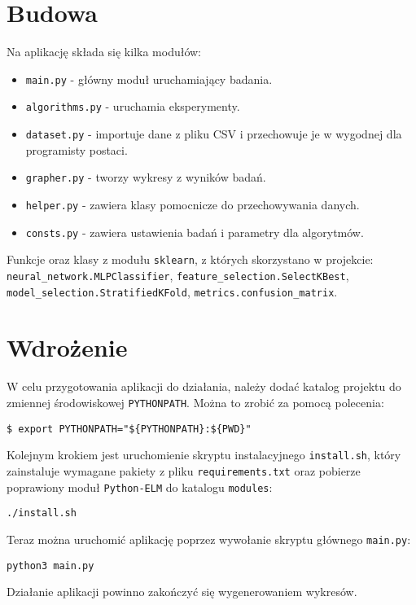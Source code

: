 \newpage

\section{Budowa}

Na aplikację składa się kilka modułów:

\begin{itemize}
    \item \texttt{main.py} - główny moduł uruchamiający badania.
    \item \texttt{algorithms.py} - uruchamia eksperymenty.
    \item \texttt{dataset.py} - importuje dane z pliku CSV i przechowuje je w wygodnej dla programisty postaci.
    \item \texttt{grapher.py} - tworzy wykresy z wyników badań.
    \item \texttt{helper.py} - zawiera klasy pomocnicze do przechowywania danych.
    \item \texttt{consts.py} - zawiera ustawienia badań i parametry dla algorytmów.
\end{itemize}

Funkcje oraz klasy z modułu \texttt{sklearn}, z których skorzystano w projekcie: \texttt{neural\_network.MLPClassifier}, \texttt{feature\_selection.SelectKBest}, \texttt{model\_selection.StratifiedKFold}, \texttt{metrics.confusion\_matrix}.
\section{Wdrożenie}

W celu przygotowania aplikacji do działania, należy dodać katalog projektu do zmiennej środowiskowej \texttt{PYTHONPATH}. Można to zrobić za pomocą polecenia:

\begin{verbatim}
$ export PYTHONPATH="${PYTHONPATH}:${PWD}"
\end{verbatim}

Kolejnym krokiem jest uruchomienie skryptu instalacyjnego \texttt{install.sh}, który zainstaluje wymagane pakiety z pliku \texttt{requirements.txt} oraz pobierze poprawiony moduł \texttt{Python-ELM} do katalogu \texttt{modules}:

\begin{verbatim}
./install.sh
\end{verbatim}

Teraz można uruchomić aplikację poprzez wywołanie skryptu głównego \texttt{main.py}:

\begin{verbatim}
python3 main.py
\end{verbatim}

Działanie aplikacji powinno zakończyć się wygenerowaniem wykresów.